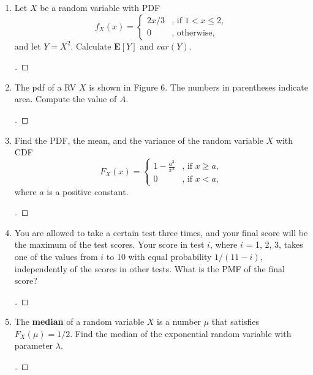 \documentclass[paper=usletter, fontsize=12pt]{article}
\newcommand{\salign}[1]{\begingroup\addtolength{\jot}{#1em}}
\newenvironment{cproof}{\begin{proof}[\unskip\nopunct]}{\end{proof}}
\begin{document}
\begin{enumerate}
        \item Let $X$ be a random variable with PDF
        \begin{equation*}
            f_X(x) = \begin{cases}
                2x/3 & \text{, if } 1 < x \le 2,\\
                0 & \text{, otherwise, }
            \end{cases}
        \end{equation*}
        and let $Y=X^2$. Calculate \textbf{E}$[Y]$ and $var(Y)$.
        \begin{cproof}
        \end{cproof}

        \item The pdf of a RV $X$ is shown in Figure 6. The numbers in
        parentheses indicate area. Compute the value of $A$.
        \begin{cproof}
        \end{cproof}

        \item Find the PDF, the mean, and the variance of the random variable
        $X$ with CDF
        \salign{1}
        \begin{equation*}
            F_X(x) = \begin{cases}
                1-\frac{a^3}{x^3} & \text{, if } x \ge a,\\
                0 & \text{, if } x < a,
            \end{cases}
        \end{equation*}
        \endgroup
        where $a$ is a positive constant.
        \begin{cproof}
        \end{cproof}

        \item You are allowed to take a certain test three times, and your
        final score will be the maximum of the test scores. Your score in test
        $i$, where $i$ = 1, 2, 3, takes one of the values from $i$ to 10 with
        equal probability $1/(11-i)$, independently of the scores in other
        tests. What is the PMF of the final score?
        \begin{cproof}
        \end{cproof}

        \item The \textbf{median} of a random variable $X$ is a number $\mu$
        that satisfies $F_X(\mu)=1/2$. Find the median of the exponential
        random variable with parameter $\lambda$.
        \begin{cproof}
        \end{cproof}

    \end{enumerate}
\end{document}
